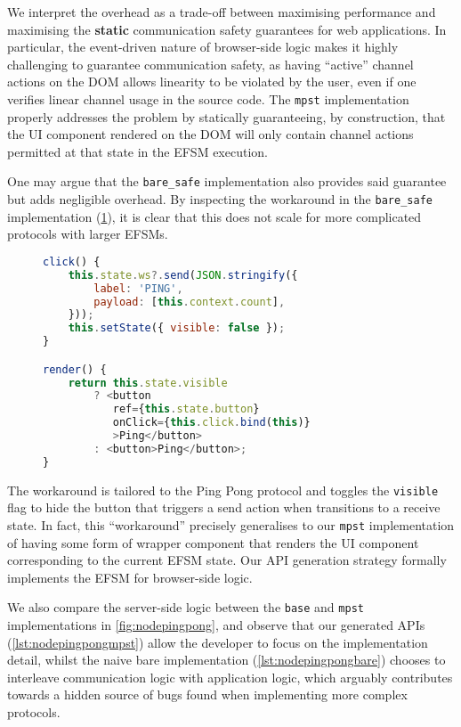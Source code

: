 We interpret the overhead as a trade-off between maximising performance and
maximising the \textbf{static} communication safety guarantees for
web applications. In particular, the event-driven nature of 
browser-side logic makes it highly challenging to guarantee 
communication safety, as having ``active'' channel actions on the DOM
allows linearity to be violated by the user, even if one verifies
linear channel usage in the source code. The \texttt{mpst} implementation
properly addresses the problem by statically guaranteeing,
by construction, that the UI component rendered on the DOM will only
contain channel actions permitted at that state in the EFSM execution.

One may argue that the \texttt{bare_safe} implementation also
provides said guarantee but adds negligible overhead. 
By inspecting the workaround in the \texttt{bare_safe} implementation
(\cref{lst:workaround}),
it is clear that this does not scale for more complicated protocols with
larger EFSMs. 

\begin{figure}[!ht]
\begin{lstlisting}[language=javascript, tabsize=2]
click() {
	this.state.ws?.send(JSON.stringify({
		label: 'PING',
		payload: [this.context.count],
	}));
	this.setState({ visible: false });
}

render() {
	return this.state.visible 
		? <button
		   ref={this.state.button}
		   onClick={this.click.bind(this)}
		   >Ping</button>
		: <button>Ping</button>;
}
\end{lstlisting}
\label{lst:workaround}
\end{figure}

The workaround is tailored to the Ping Pong protocol
and toggles the \texttt{visible} flag to hide the button that triggers
a send action when  transitions to a receive state.
In fact, this ``workaround'' precisely generalises to our 
\texttt{mpst} implementation of having some form of wrapper
component that renders the UI component corresponding to the
current EFSM state. Our API generation strategy formally implements
the EFSM for browser-side logic.

We also compare the server-side logic between the \texttt{base} and
\texttt{mpst} implementations in \cref{fig:nodepingpong}, and observe
that our generated APIs (\cref{lst:nodepingpongmpst}) 
allow the developer to focus on the
implementation detail, whilst the naive bare implementation 
(\cref{lst:nodepingpongbare}) chooses to interleave communication logic
with application logic, which arguably contributes towards a hidden
source of bugs found when implementing more complex protocols.

